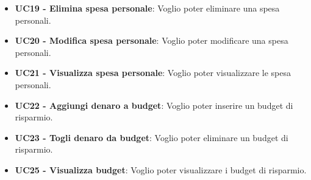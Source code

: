 \begin{itemize}
    \item \textbf{UC19 - Elimina spesa personale}: Voglio poter eliminare una spesa personali.
    \item \textbf{UC20 - Modifica spesa personale}: Voglio poter modificare una spesa personali.
    \item \textbf{UC21 - Visualizza spesa personale}: Voglio poter visualizzare le spesa personali.
    \item \textbf{UC22 - Aggiungi denaro a budget}: Voglio poter inserire un budget di risparmio.
    \item \textbf{UC23 - Togli denaro da budget}: Voglio poter eliminare un budget di risparmio.
    \item \textbf{UC25 - Visualizza budget}: Voglio poter visualizzare i budget di risparmio.
\end{itemize}
